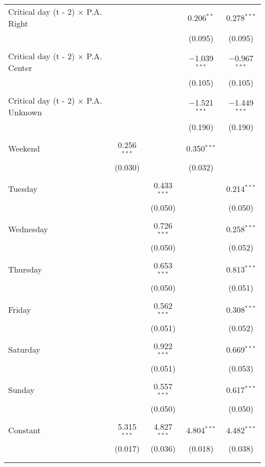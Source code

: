 \documentclass[
]{article}
\begin{document}
\begin{table}[!htbp]
{\begin{tabular}{@{\extracolsep{5pt}}lcccc}
 Critical day (t - 2) $\times$ P.A. Right &  &  & 0.206$^{**}$ & 0.278$^{***}$ \\ 
  &  &  & (0.095) & (0.095) \\ 
  & & & & \\ 
 Critical day (t - 2) $\times$ P.A. Center &  &  & $-$1.039$^{***}$ & $-$0.967$^{***}$ \\ 
  &  &  & (0.105) & (0.105) \\ 
  & & & & \\ 
 Critical day (t - 2) $\times$ P.A. Unknown &  &  & $-$1.521$^{***}$ & $-$1.449$^{***}$ \\ 
  &  &  & (0.190) & (0.190) \\ 
  & & & & \\ 
 Weekend & 0.256$^{***}$ &  & 0.350$^{***}$ &  \\ 
  & (0.030) &  & (0.032) &  \\ 
  & & & & \\ 
 Tuesday &  & 0.433$^{***}$ &  & 0.214$^{***}$ \\ 
  &  & (0.050) &  & (0.050) \\ 
  & & & & \\ 
 Wednesday &  & 0.726$^{***}$ &  & 0.258$^{***}$ \\ 
  &  & (0.050) &  & (0.052) \\ 
  & & & & \\ 
 Thursday &  & 0.653$^{***}$ &  & 0.813$^{***}$ \\ 
  &  & (0.050) &  & (0.051) \\ 
  & & & & \\ 
 Friday &  & 0.562$^{***}$ &  & 0.308$^{***}$ \\ 
  &  & (0.051) &  & (0.052) \\ 
  & & & & \\ 
 Saturday &  & 0.922$^{***}$ &  & 0.669$^{***}$ \\ 
  &  & (0.051) &  & (0.053) \\ 
  & & & & \\ 
 Sunday &  & 0.557$^{***}$ &  & 0.617$^{***}$ \\ 
  &  & (0.050) &  & (0.050) \\ 
  & & & & \\ 
 Constant & 5.315$^{***}$ & 4.827$^{***}$ & 4.804$^{***}$ & 4.482$^{***}$ \\ 
  & (0.017) & (0.036) & (0.018) & (0.038) \\ 
  & & & & \\ 
\hline \\[-1.8ex] 

\end{tabular}}
\end{table}
\end{document}
